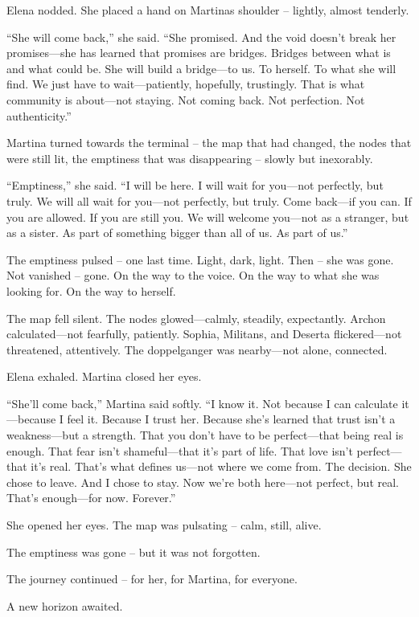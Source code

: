 \documentclass[
]{article}
\begin{document}
Elena nodded. She placed a hand on Martina\textquotesingle s shoulder -- lightly, almost tenderly.

``She will come back,'' she said. ``She promised. And the void doesn't break her promises---she has learned that promises are bridges. Bridges between what is and what could be. She will build a bridge---to us. To herself. To what she will find. We just have to wait---patiently, hopefully, trustingly. That is what community is about---not staying. Not coming back. Not perfection. Not authenticity.''

Martina turned towards the terminal -- the map that had changed, the nodes that were still lit, the emptiness that was disappearing -- slowly but inexorably.

``Emptiness,'' she said. ``I will be here. I will wait for you---not perfectly, but truly. We will all wait for you---not perfectly, but truly. Come back---if you can. If you are allowed. If you are still you. We will welcome you---not as a stranger, but as a sister. As part of something bigger than all of us. As part of us.''

The emptiness pulsed -- one last time. Light, dark, light. Then -- she was gone. Not vanished -- gone. On the way to the voice. On the way to what she was looking for. On the way to herself.

The map fell silent. The nodes glowed---calmly, steadily, expectantly. Archon calculated---not fearfully, patiently. Sophia, Militans, and Deserta flickered---not threatened, attentively. The doppelganger was nearby---not alone, connected.

Elena exhaled. Martina closed her eyes.

``She'll come back,'' Martina said softly. ``I know it. Not because I can calculate it---because I feel it. Because I trust her. Because she's learned that trust isn't a weakness---but a strength. That you don't have to be perfect---that being real is enough. That fear isn't shameful---that it's part of life. That love isn't perfect---that it's real. That's what defines us---not where we come from. The decision. She chose to leave. And I chose to stay. Now we're both here---not perfect, but real. That's enough---for now. Forever.''

She opened her eyes. The map was pulsating -- calm, still, alive.

The emptiness was gone -- but it was not forgotten.

The journey continued -- for her, for Martina, for everyone.

A new horizon awaited.
\end{document}
